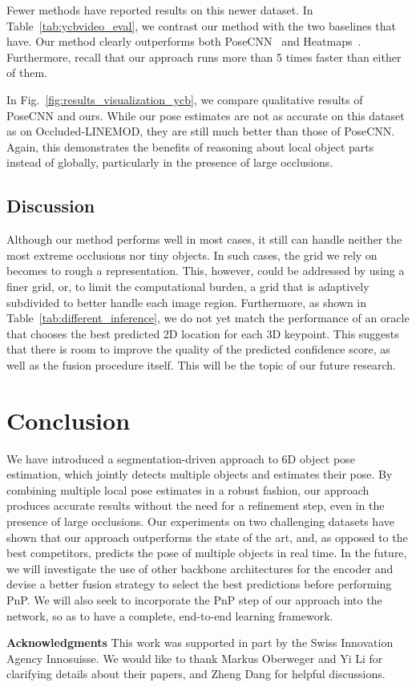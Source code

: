 \documentclass[10pt,twocolumn,letterpaper]{article}
\begin{document}
Fewer methods have reported results on this newer dataset. In Table~\ref{tab:ycbvideo_eval}, we contrast our method with the two baselines that have. Our method clearly outperforms both PoseCNN~\cite{Xiang18b} and Heatmaps~\cite{Oberweger18}. Furthermore, recall that our approach runs more than 5 times faster than either of them.

In Fig.~\ref{fig:results_visualization_ycb}, we compare qualitative results of PoseCNN and ours. While our pose estimates are not as accurate on this dataset as on Occluded-LINEMOD, they are still much better than those of PoseCNN. Again, this demonstrates the benefits of reasoning about local object parts instead of globally, particularly in the presence of large occlusions.

\subsection{Discussion}
\label{sec:limitation}

Although our method performs well in most cases, it still can handle neither the most extreme occlusions nor tiny objects. In such cases, the grid we rely on becomes to rough a representation. This, however, could be addressed by using a finer grid, or, to limit the computational burden, a grid that is adaptively subdivided to better handle each image region. Furthermore, as shown in Table~\ref{tab:different_inference}, we do not yet match the performance of an oracle that chooses the best predicted 2D location for each 3D keypoint. This suggests that there is room to improve the quality of the predicted confidence score, as well as the fusion procedure itself. This will be the topic of our future research.
 

\section{Conclusion}
\label{sec:conclusion}

We have introduced a segmentation-driven approach to 6D object pose estimation, which jointly detects multiple objects and estimates their pose. By combining multiple local pose estimates in a robust fashion, our approach produces accurate results without the need for a refinement step, even in the presence of large occlusions. Our experiments on two challenging datasets have shown that our approach outperforms the state of the art, and, as opposed to the best competitors, predicts the pose of multiple objects in real time. In the future, we will investigate the use of other backbone architectures for the encoder and devise a better fusion strategy to select the best predictions before performing PnP. We will also seek to incorporate the PnP step of our approach into the network, so as to have a complete, end-to-end learning framework.

\vspace{1em}
{\bf Acknowledgments} This work was supported in part by the Swiss Innovation Agency Innosuisse. We would like to thank Markus Oberweger and Yi Li for clarifying details about their papers, and Zheng Dang for helpful discussions.
 
{\small


}
\end{document}

